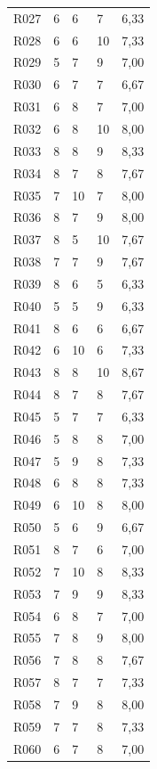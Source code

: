 {\begin{longtable}{L{1.05cm}R{2.1cm}R{2.1cm}R{2.1cm}R{3.0cm}}
R027 & 6 & 6 & 7 & 6,33 \\
R028 & 6 & 6 & 10 & 7,33 \\
R029 & 5 & 7 & 9 & 7,00 \\
R030 & 6 & 7 & 7 & 6,67 \\
R031 & 6 & 8 & 7 & 7,00 \\
R032 & 6 & 8 & 10 & 8,00 \\
R033 & 8 & 8 & 9 & 8,33 \\
R034 & 8 & 7 & 8 & 7,67 \\
R035 & 7 & 10 & 7 & 8,00 \\
R036 & 8 & 7 & 9 & 8,00 \\
R037 & 8 & 5 & 10 & 7,67 \\
R038 & 7 & 7 & 9 & 7,67 \\
R039 & 8 & 6 & 5 & 6,33 \\
R040 & 5 & 5 & 9 & 6,33 \\
R041 & 8 & 6 & 6 & 6,67 \\
R042 & 6 & 10 & 6 & 7,33 \\
R043 & 8 & 8 & 10 & 8,67 \\
R044 & 8 & 7 & 8 & 7,67 \\
R045 & 5 & 7 & 7 & 6,33 \\
R046 & 5 & 8 & 8 & 7,00 \\
R047 & 5 & 9 & 8 & 7,33 \\
R048 & 6 & 8 & 8 & 7,33 \\
R049 & 6 & 10 & 8 & 8,00 \\
R050 & 5 & 6 & 9 & 6,67 \\
R051 & 8 & 7 & 6 & 7,00 \\
R052 & 7 & 10 & 8 & 8,33 \\
R053 & 7 & 9 & 9 & 8,33 \\
R054 & 6 & 8 & 7 & 7,00 \\
R055 & 7 & 8 & 9 & 8,00 \\
R056 & 7 & 8 & 8 & 7,67 \\
R057 & 8 & 7 & 7 & 7,33 \\
R058 & 7 & 9 & 8 & 8,00 \\
R059 & 7 & 7 & 8 & 7,33 \\
R060 & 6 & 7 & 8 & 7,00 \\
\end{longtable}
}

